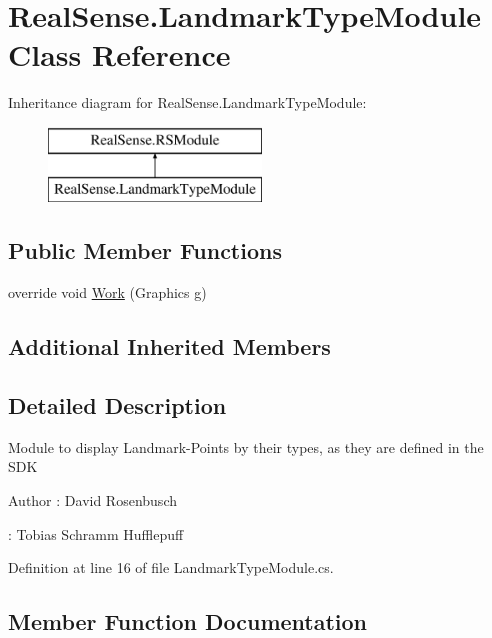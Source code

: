 \hypertarget{class_real_sense_1_1_landmark_type_module}{}\section{Real\+Sense.\+Landmark\+Type\+Module Class Reference}
\label{class_real_sense_1_1_landmark_type_module}
Inheritance diagram for Real\+Sense.\+Landmark\+Type\+Module\+:\begin{figure}[H]
\begin{center}
\leavevmode
\includegraphics[height=2.000000cm]{class_real_sense_1_1_landmark_type_module}
\end{center}
\end{figure}
\subsection*{Public Member Functions}
\begin{DoxyCompactItemize}
\item 
override void \hyperlink{class_real_sense_1_1_landmark_type_module_ad110598b840e5496c1539862c4c53bc7}{Work} (Graphics g)
\end{DoxyCompactItemize}
\subsection*{Additional Inherited Members}


\subsection{Detailed Description}
Module to display Landmark-\/\+Points by their types, as they are defined in the S\+DK \begin{DoxyAuthor}{Author}
\+: David Rosenbusch 

\+: Tobias Schramm  Hufflepuff 
\end{DoxyAuthor}


Definition at line 16 of file Landmark\+Type\+Module.\+cs.



\subsection{Member Function Documentation}
\mbox{\label{class_real_sense_1_1_landmark_type_module_ad110598b840e5496c1539862c4c53bc7}} 
